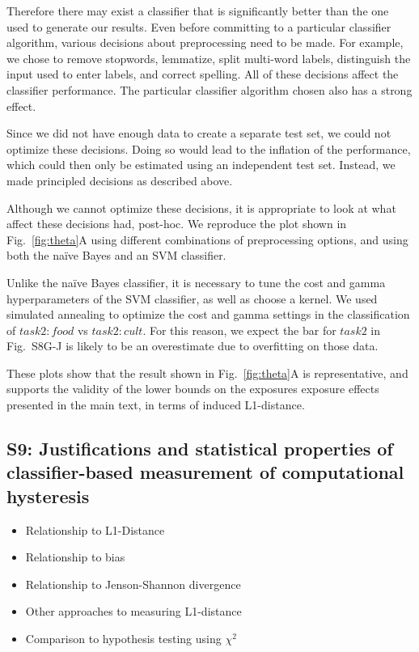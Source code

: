 \documentclass[12pt]{article}
\begin{document}
Therefore there may exist a classifier that is 
significantly better than the one used to generate our results.  Even before
committing to a particular classifier algorithm, various decisions about
preprocessing need to be made.  For example, we chose to remove stopwords,
lemmatize, split multi-word labels, distinguish the input used to enter 
labels, and correct spelling.  All of these decisions affect the classifier
performance.  The particular classifier algorithm chosen also has a strong 
effect.

Since we did not have enough data to create a separate test set, we could not
optimize these decisions.  Doing so would lead to the inflation of the 
performance, which could then only be estimated using an independent test set.
Instead, we made principled decisions as described above.

Although we cannot optimize these decisions, it is appropriate to look at
what affect these decisions had, post-hoc.  We reproduce the plot shown in 
Fig.~\ref{fig:theta}A using different combinations of preprocessing options,
and using both the na\"ive Bayes and an SVM classifier.

Unlike the na\"ive Bayes classifier, it is necessary to tune the cost and 
gamma hyperparameters of the SVM classifier, as well as choose a kernel.
We used simulated annealing to optimize the cost and gamma settings in the
classification of $task2:food$ vs $task2:cult$.  For this reason, we expect
the bar for $task2$ in Fig.~S8G-J is likely to be an overestimate due to
overfitting on those data.

These plots show that the result shown in Fig.~\ref{fig:theta}A is 
representative, and supports the validity of the lower bounds on the 
exposures exposure effects presented in the main text, in terms of induced 
L1-distance.


\subsection*{S9: Justifications and statistical properties of classifier-based measurement of computational hysteresis}
\begin{itemize}
	\item{Relationship to L1-Distance}
	\item{Relationship to bias}
	\item{Relationship to Jenson-Shannon divergence}
	\item{Other approaches to measuring L1-distance}
	\item{Comparison to hypothesis testing using $\chi^2$}
\end{itemize}
\end{document}
